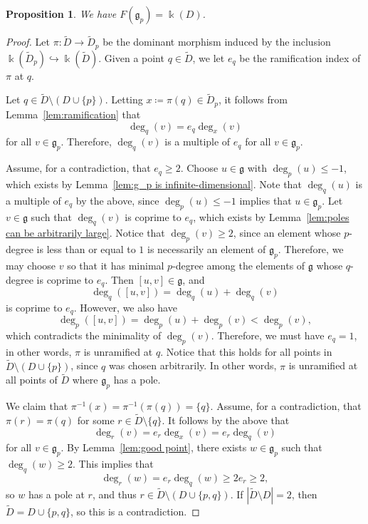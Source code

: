 \documentclass[12pt]{amsart}
\theoremstyle{plain}
\newtheorem{proposition}[theorem]{Proposition}
\theoremstyle{definition}
\numberwithin{equation}{section}
\def\g{\mathfrak{g}}
\def\kk{\Bbbk}
\begin{document}
\begin{proposition}\label{prop:field of g_p}
    We have $F(\g_p) = \kk(D)$.
\end{proposition}
\begin{proof}
    Let $\pi \colon \widetilde{D} \to \widetilde{D}_p$ be the dominant morphism induced by the inclusion $\kk(\widetilde{D}_p) \hookrightarrow \kk(\widetilde{D})$. Given a point $q \in \widetilde{D}$, we let $e_q$ be the ramification index of $\pi$ at $q$.

    Let $q \in \widetilde{D} \setminus (D \cup \{p\})$. Letting $x \coloneqq \pi(q) \in \widetilde{D}_p$, it follows from Lemma~\ref{lem:ramification} that
    $$\deg_q(v) = e_q \deg_x(v)$$
    for all $v \in \g_p$. Therefore, $\deg_q(v)$ is a multiple of $e_q$ for all $v \in \g_p$.

    Assume, for a contradiction, that $e_q \geq 2$. Choose $u \in \g$ with $\deg_p(u) \leq -1$, which exists by Lemma~\ref{lem:g_p is infinite-dimensional}. Note that $\deg_q(u)$ is a multiple of $e_q$ by the above, since $\deg_p(u) \leq -1$ implies that $u \in \g_p$. Let $v \in \g$ such that $\deg_q(v)$ is coprime to $e_q$, which exists by Lemma~\ref{lem:poles can be arbitrarily large}. Notice that $\deg_p(v) \geq 2$, since an element whose $p$-degree is less than or equal to $1$ is necessarily an element of $\g_p$. Therefore, we may choose $v$ so that it has minimal $p$-degree among the elements of $\g$ whose $q$-degree is coprime to $e_q$. Then $[u,v] \in \g$, and
    $$\deg_q([u,v]) = \deg_q(u) + \deg_q(v)$$
    is coprime to $e_q$. However, we also have
    $$\deg_p([u,v]) = \deg_p(u) + \deg_p(v) < \deg_p(v),$$
    which contradicts the minimality of $\deg_p(v)$. Therefore, we must have $e_q = 1$, in other words, $\pi$ is unramified at $q$. Notice that this holds for all points in $\widetilde{D} \setminus (D \cup \{p\})$, since $q$ was chosen arbitrarily. In other words, $\pi$ is unramified at all points of $\widetilde{D}$ where $\g_p$ has a pole.

    We claim that $\pi^{-1}(x) = \pi^{-1}(\pi(q)) = \{q\}$. Assume, for a contradiction, that $\pi(r) = \pi(q)$ for some $r \in \widetilde{D} \setminus \{q\}$. It follows by the above that
    $$\deg_r(v) = e_r\deg_x(v) = e_r\deg_q(v)$$
    for all $v \in \g_p$. By Lemma~\ref{lem:good point}, there exists $w \in \g_p$ such that $\deg_q(w) \geq 2$. This implies that
    $$\deg_r(w) = e_r \deg_q(w) \geq 2e_r \geq 2,$$
    so $w$ has a pole at $r$, and thus $r \in \widetilde{D} \setminus (D \cup \{p,q\})$. If $|\widetilde{D} \setminus D| = 2$, then $\widetilde{D} = D \cup \{p,q\}$, so this is a contradiction.
    

\end{proof}
\end{document}
